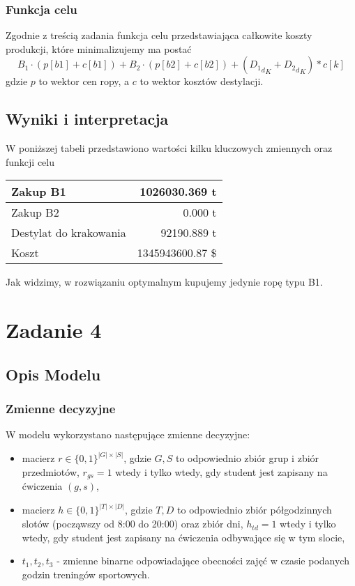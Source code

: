 \documentclass{article}
\begin{document}
\subsubsection{Funkcja celu}
Zgodnie z treścią zadania funkcja celu przedstawiająca całkowite koszty produkcji, które minimalizujemy ma postać
\[B_1 \cdot (p[b1] + c[b1]) + B_2 \cdot (p[b2] + c[b2]) + ({{D_1}_d}_K + {{D_2}_d}_K)*c[k]\]
gdzie $p$ to wektor cen ropy, a $c$ to wektor kosztów destylacji.
\subsection{Wyniki i interpretacja}
W poniższej tabeli przedstawiono wartości kilku kluczowych zmiennych oraz funkcji celu
\begin{table}[H]
\centering
\begin{tabular}{|l|r|}\hline
Zakup B1 & 1026030.369 t\\\hline
Zakup B2 & 0.000 t\\\hline
Destylat do krakowania & 92190.889 t\\\hline
Koszt & 1345943600.87 \$\\\hline
\end{tabular}
\end{table}

Jak widzimy, w rozwiązaniu optymalnym kupujemy jedynie ropę typu B1.

\section{Zadanie 4}
\subsection{Opis Modelu}
\subsubsection{Zmienne decyzyjne}
W modelu wykorzystano następujące zmienne decyzyjne:
\begin{itemize}
	\item macierz $r \in \{0,1\}^{|G| \times |S|}$, gdzie $G,S$ to odpowiednio zbiór grup i zbiór przedmiotów, $r_{gs} = 1$ wtedy i tylko wtedy, gdy student jest zapisany na ćwiczenia $(g,s)$,
	\item macierz $h \in \{0,1\}^{|T| \times |D|}$, gdzie $T,D$ to odpowiednio zbiór półgodzinnych slotów (począwszy od 8:00 do 20:00) oraz zbiór dni, $h_{td} = 1$ wtedy i tylko wtedy, gdy student jest zapisany na ćwiczenia odbywające się w tym slocie,
	\item $t_1,t_2,t_3$ - zmienne binarne odpowiadające obecności zajęć w czasie podanych godzin treningów sportowych.
\end{itemize}
\end{document}
